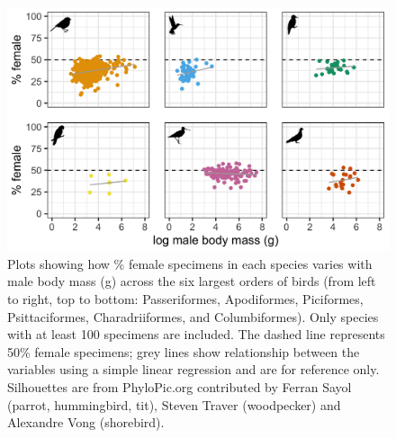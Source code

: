 \documentclass[a4paper, 12pt]{article}
\begin{document}
\begin{figure}[H]
 \centering
  \includegraphics[width = \linewidth]{figures/mass-orders-birds.png}
  \caption{Plots showing how \% female specimens in each species varies with male body mass (g) across the six largest orders of birds (from left to right, top to bottom: Passeriformes, Apodiformes, Piciformes, Psittaciformes, Charadriiformes, and Columbiformes). 
  Only species with at least 100 specimens are included. 
  The dashed line represents 50\% female specimens; grey lines show relationship between the variables using a simple linear regression and are for reference only. 
  Silhouettes are from PhyloPic.org contributed by Ferran Sayol (parrot, hummingbird, tit), Steven Traver (woodpecker) and Alexandre Vong (shorebird).}
  \label{fig-bird-male-mass}
\end{figure}
\end{document}
